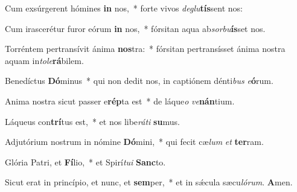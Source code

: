 Cum exsúrgerent hómines \textbf{in} nos,~* forte vivos \textit{de}\textit{glu}\textbf{tís}sent nos:

Cum irascerétur furor eórum \textbf{in} nos,~* fórsitan aqua ab\textit{sor}\textit{bu}\textbf{ís}set nos.

Torréntem pertransívit ánima \textbf{nos}tra:~* fórsitan pertransísset ánima nostra aquam in\textit{to}\textit{le}\textbf{rá}bilem.

Benedíctus \textbf{Dó}minus~* qui non dedit nos, in captiónem dénti\textit{bus} \textit{e}\textbf{ó}rum.

Anima nostra sicut passer e\textbf{rép}ta est~* de láque\textit{o} \textit{ve}\textbf{nán}tium.

Láqueus con\textbf{trí}tus est,~* et nos libe\textit{rá}\textit{ti} \textbf{su}mus.

Adjutórium nostrum in nómine \textbf{Dó}mini,~* qui fecit cæ\textit{lum} \textit{et} \textbf{ter}ram.

Glória Patri, et \textbf{Fí}lio,~* et Spirí\textit{tu}\textit{i} \textbf{Sanc}to.

Sicut erat in princípio, et nunc, et \textbf{sem}per,~* et in sǽcula sæcu\textit{ló}\textit{rum}. \textbf{A}men.

